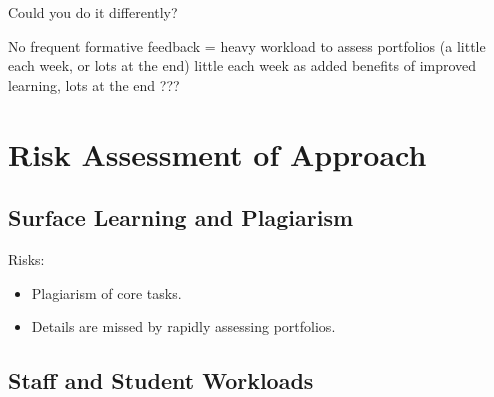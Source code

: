 







Could you do it differently?

No frequent formative feedback = heavy workload to assess portfolios (a little each week, or lots at the end) little each week as added benefits of improved learning, lots at the end ???


\section{Risk Assessment of Approach} %
\label{sec:risk_assessment_of_approach}



\subsection{Surface Learning and Plagiarism} %
\label{sub:surface_learning_and_plagiarism}

Risks:
\begin{itemize}[noitemsep,nolistsep]
	\item Plagiarism of core tasks.
	\item Details are missed by rapidly assessing portfolios.
\end{itemize}


\subsection{Staff and Student Workloads} %
\label{sub:staff_and_student_workloads}







